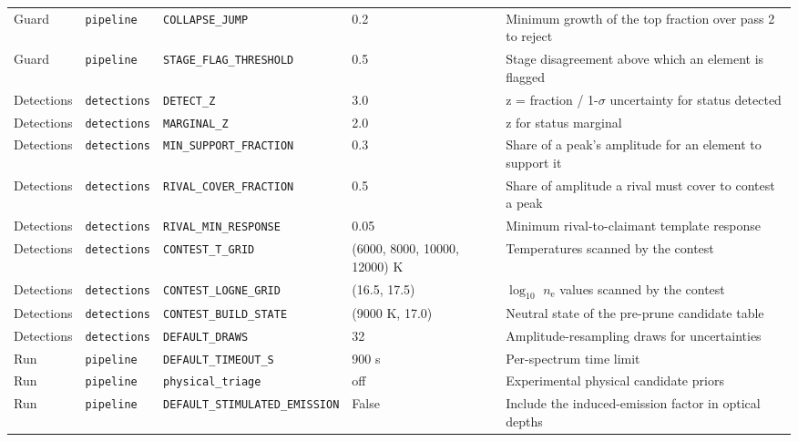 \begin{table}[!htbp]
\begin{tabular}{@{}p{}p{}p{}p{}p{}@{}}
Guard & \texttt{pipeline} & \texttt{COLLAPSE\_\allowbreak{}JUMP} & 0.2 & Minimum growth of the top fraction over pass 2 to reject \\
Guard & \texttt{pipeline} & \texttt{STAGE\_\allowbreak{}FLAG\_\allowbreak{}THRESHOLD} & 0.5 & Stage disagreement above which an element is flagged \\
Detections & \texttt{detections} & \texttt{DETECT\_\allowbreak{}Z} & 3.0 & z = fraction / 1-$\sigma$ uncertainty for status detected \\
Detections & \texttt{detections} & \texttt{MARGINAL\_\allowbreak{}Z} & 2.0 & z for status marginal \\
Detections & \texttt{detections} & \texttt{MIN\_\allowbreak{}SUPPORT\_\allowbreak{}FRACTION} & 0.3 & Share of a peak's amplitude for an element to support it \\
Detections & \texttt{detections} & \texttt{RIVAL\_\allowbreak{}COVER\_\allowbreak{}FRACTION} & 0.5 & Share of amplitude a rival must cover to contest a peak \\
Detections & \texttt{detections} & \texttt{RIVAL\_\allowbreak{}MIN\_\allowbreak{}RESPONSE} & 0.05 & Minimum rival-to-claimant template response \\
Detections & \texttt{detections} & \texttt{CONTEST\_\allowbreak{}T\_\allowbreak{}GRID} & (6000, 8000, 10000, 12000) K & Temperatures scanned by the contest \\
Detections & \texttt{detections} & \texttt{CONTEST\_\allowbreak{}LOGNE\_\allowbreak{}GRID} & (16.5, 17.5) & $\log_{10}$ $n_\mathrm{e}$ values scanned by the contest \\
Detections & \texttt{detections} & \texttt{CONTEST\_\allowbreak{}BUILD\_\allowbreak{}STATE} & (9000 K, 17.0) & Neutral state of the pre-prune candidate table \\
Detections & \texttt{detections} & \texttt{DEFAULT\_\allowbreak{}DRAWS} & 32 & Amplitude-resampling draws for uncertainties \\
Run & \texttt{pipeline} & \texttt{DEFAULT\_\allowbreak{}TIMEOUT\_\allowbreak{}S} & 900 s & Per-spectrum time limit \\
Run & \texttt{pipeline} & \texttt{physical\_\allowbreak{}triage} & off & Experimental physical candidate priors \\
Run & \texttt{pipeline} & \texttt{DEFAULT\_\allowbreak{}STIMULATED\_\allowbreak{}EMISSION} & False & Include the induced-emission factor in optical depths \\
\bottomrule
\end{tabular}
\end{table}
